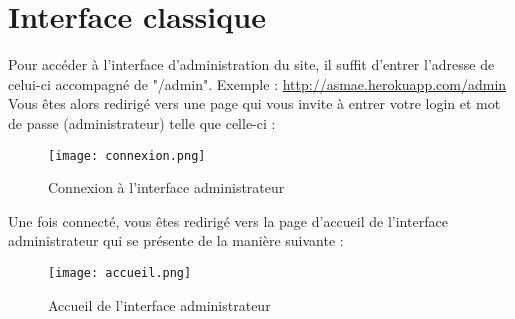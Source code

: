 \section{Interface classique}

Pour accéder à l’interface d’administration du site, il suffit d’entrer l’adresse de celui-ci accompagné de "/admin". Exemple : \url{http://asmae.herokuapp.com/admin}\\
Vous êtes alors redirigé vers une page qui vous invite à entrer votre login et mot de passe (administrateur) telle que celle-ci :

\begin{figure}[H]
\centering
\texttt{[image: connexion.png]}
\caption{Connexion à l'interface administrateur}
\end{figure}

Une fois connecté, vous êtes redirigé vers la page d'accueil de l'interface administrateur qui se présente de la manière suivante :

\begin{figure}[H]
\centering
\texttt{[image: accueil.png]}
\caption{Accueil de l'interface administrateur}
\end{figure}

